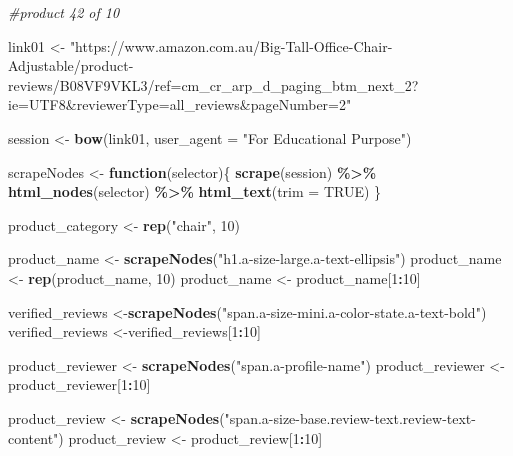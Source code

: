 \documentclass[
]{article}
\newenvironment{Shaded}{\begin{snugshade}}{\end{snugshade}}
\newcommand{\AttributeTok}[1]{\textcolor[rgb]{0.13,0.29,0.53}{#1}}
\newcommand{\CommentTok}[1]{\textcolor[rgb]{0.56,0.35,0.01}{\textit{#1}}}
\newcommand{\ConstantTok}[1]{\textcolor[rgb]{0.56,0.35,0.01}{#1}}
\newcommand{\ControlFlowTok}[1]{\textcolor[rgb]{0.13,0.29,0.53}{\textbf{#1}}}
\newcommand{\DecValTok}[1]{\textcolor[rgb]{0.00,0.00,0.81}{#1}}
\newcommand{\FunctionTok}[1]{\textcolor[rgb]{0.13,0.29,0.53}{\textbf{#1}}}
\newcommand{\NormalTok}[1]{#1}
\newcommand{\OtherTok}[1]{\textcolor[rgb]{0.56,0.35,0.01}{#1}}
\newcommand{\SpecialCharTok}[1]{\textcolor[rgb]{0.81,0.36,0.00}{\textbf{#1}}}
\newcommand{\StringTok}[1]{\textcolor[rgb]{0.31,0.60,0.02}{#1}}
\begin{document}
\begin{Shaded}
\begin{Highlighting}[]
\CommentTok{\#product 42 of 10}

\NormalTok{link01 }\OtherTok{\textless{}{-}} \StringTok{"https://www.amazon.com.au/Big{-}Tall{-}Office{-}Chair{-}Adjustable/product{-}reviews/B08VF9VKL3/ref=cm\_cr\_arp\_d\_paging\_btm\_next\_2?ie=UTF8\&reviewerType=all\_reviews\&pageNumber=2"}


\NormalTok{  session }\OtherTok{\textless{}{-}} \FunctionTok{bow}\NormalTok{(link01,}
               \AttributeTok{user\_agent =} \StringTok{"For Educational Purpose"}\NormalTok{)}

\NormalTok{  scrapeNodes }\OtherTok{\textless{}{-}} \ControlFlowTok{function}\NormalTok{(selector)\{}
    \FunctionTok{scrape}\NormalTok{(session) }\SpecialCharTok{\%\textgreater{}\%}
      \FunctionTok{html\_nodes}\NormalTok{(selector) }\SpecialCharTok{\%\textgreater{}\%}
      \FunctionTok{html\_text}\NormalTok{(}\AttributeTok{trim =} \ConstantTok{TRUE}\NormalTok{)}
\NormalTok{  \}}

\NormalTok{  product\_category }\OtherTok{\textless{}{-}} \FunctionTok{rep}\NormalTok{(}\StringTok{"chair"}\NormalTok{, }\DecValTok{10}\NormalTok{)}

\NormalTok{  product\_name }\OtherTok{\textless{}{-}} \FunctionTok{scrapeNodes}\NormalTok{(}\StringTok{"h1.a{-}size{-}large.a{-}text{-}ellipsis"}\NormalTok{)}
\NormalTok{  product\_name }\OtherTok{\textless{}{-}} \FunctionTok{rep}\NormalTok{(product\_name, }\DecValTok{10}\NormalTok{)}
\NormalTok{  product\_name }\OtherTok{\textless{}{-}}\NormalTok{ product\_name[}\DecValTok{1}\SpecialCharTok{:}\DecValTok{10}\NormalTok{]}
  
\NormalTok{  verified\_reviews }\OtherTok{\textless{}{-}}\FunctionTok{scrapeNodes}\NormalTok{(}\StringTok{"span.a{-}size{-}mini.a{-}color{-}state.a{-}text{-}bold"}\NormalTok{)}
\NormalTok{  verified\_reviews }\OtherTok{\textless{}{-}}\NormalTok{verified\_reviews[}\DecValTok{1}\SpecialCharTok{:}\DecValTok{10}\NormalTok{]}
  
\NormalTok{  product\_reviewer }\OtherTok{\textless{}{-}} \FunctionTok{scrapeNodes}\NormalTok{(}\StringTok{"span.a{-}profile{-}name"}\NormalTok{)}
\NormalTok{  product\_reviewer }\OtherTok{\textless{}{-}}\NormalTok{ product\_reviewer[}\DecValTok{1}\SpecialCharTok{:}\DecValTok{10}\NormalTok{]}
  
\NormalTok{  product\_review }\OtherTok{\textless{}{-}} \FunctionTok{scrapeNodes}\NormalTok{(}\StringTok{"span.a{-}size{-}base.review{-}text.review{-}text{-}content"}\NormalTok{)}
\NormalTok{  product\_review }\OtherTok{\textless{}{-}}\NormalTok{ product\_review[}\DecValTok{1}\SpecialCharTok{:}\DecValTok{10}\NormalTok{]}
  

\end{Highlighting}
\end{Shaded}
\end{document}

